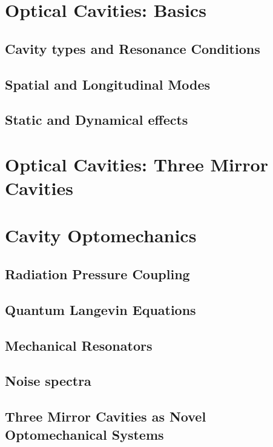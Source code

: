 \section{Optical Cavities: Basics}
\subsection{Cavity types and Resonance Conditions}
\subsection{Spatial and Longitudinal Modes}
\subsection{Static and Dynamical effects}
\hspace{1pt}

\section{\texorpdfstring{\color{red}Optical Cavities: Three Mirror Cavities}{Optical Cavities: Three Mirror Cavities}}
\subsection{}
\hspace{1pt}

\section{Cavity Optomechanics}
\subsection{Radiation Pressure Coupling}
\subsection{Quantum Langevin Equations}
\subsection{\texorpdfstring{Mechanical Resonators}{Mechanical Resonators}}
\subsection{Noise spectra}
\subsection{\texorpdfstring{\color{red} Three Mirror Cavities as Novel Optomechanical Systems}{Three Mirror Cavities as Novel Optomechanical Systems}}
\hspace{1pt}

